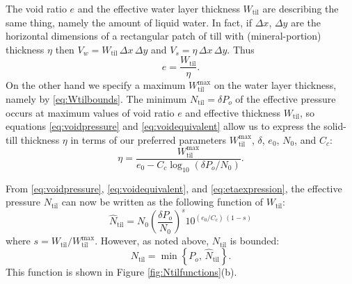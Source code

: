 \documentclass[gmd]{copernicus}   %
\newcommand{\text}{\textrm}
\newcommand{\Ntil}{N_{\text{til}}}
\newcommand{\hatNtil}{\hat N_{\text{til}}}
\newcommand{\Wtil}{W_{\text{til}}}
\newcommand{\Wtilmax}{W_{\text{til}}^{\text{max}}}
\begin{document}
The void ratio $e$ and the effective water layer thickness $\Wtil$ are describing the same thing, namely the amount of liquid water.  In fact, if $\Delta x$, $\Delta y$ are the horizontal dimensions of a rectangular patch of till with (mineral-portion) thickness $\eta$ then $V_w = \Wtil \,\Delta x \,\Delta y$ and $V_s = \eta \,\Delta x \,\Delta y$.  Thus
\begin{equation}
e = \frac{\Wtil}{\eta}.  \label{eq:voidequivalent}
\end{equation}
On the other hand we specify a maximum $\Wtilmax$ on the water layer thickness, namely by \eqref{eq:Wtilbounds}.  The minimum $\Ntil=\delta P_o$ of the effective pressure occurs at maximum values of void ratio $e$ and effective thickness $\Wtil$, so equations \eqref{eq:voidpressure} and \eqref{eq:voidequivalent} allow us to express the solid-till thickness $\eta$ in terms of our preferred parameters $\Wtilmax$, $\delta$, $e_0$, $N_0$, and $C_c$:
\begin{equation}
\eta = \frac{\Wtilmax}{e_0 - C_c \log_{10}\left(\delta P_o / N_0\right)}.  \label{eq:etaexpression}
\end{equation}

From \eqref{eq:voidpressure}, \eqref{eq:voidequivalent}, and \eqref{eq:etaexpression}, the effective pressure $\Ntil$ can now be written as the following function of $\Wtil$:
\begin{equation}
\hatNtil = N_0 \left(\frac{\delta P_o}{N_0}\right)^s 10^{(e_0/C_c)\,(1-s)}
\label{eq:NtilofWtil}
\end{equation}
where $s = \Wtil/\Wtilmax$.  However, as noted above, $\Ntil$ is bounded:
\begin{equation}
\Ntil = \min\left\{P_o,\, \hatNtil\right\}.
\label{eq:Wtilpressure}
\end{equation}
This function is shown in Figure \ref{fig:Ntilfunctions}(b).
\end{document}
